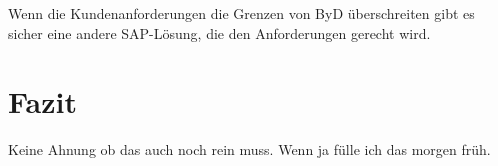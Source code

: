 \documentclass{handout}
\begin{document}
Wenn die Kundenanforderungen die Grenzen von ByD überschreiten gibt es sicher eine andere SAP-Lösung, die den Anforderungen gerecht wird.

\section{Fazit}

Keine Ahnung ob das auch noch rein muss. Wenn ja fülle ich das morgen früh.


\newpage


\end{document}
